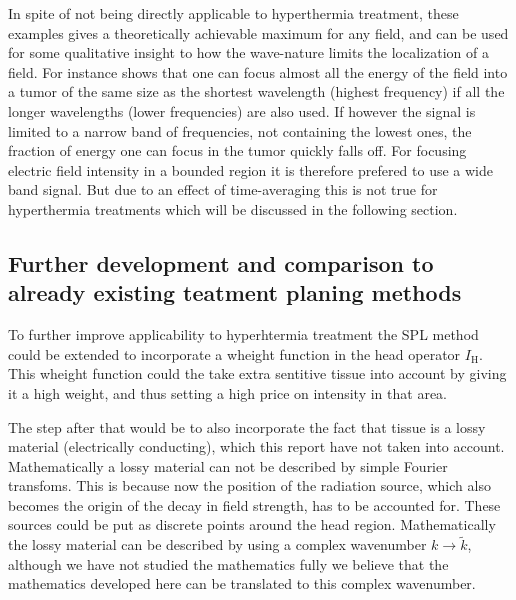 \documentclass[11pt,a4paper, 
swedish,english %
]{article}
\begin{document}
In spite of not being directly applicable to hyperthermia treatment, these examples gives a theoretically achievable maximum for any field, and can be used for some qualitative insight to how the wave-nature limits the localization of a field. For instance  shows that one can focus almost all the energy of the field into a tumor of the same size as the shortest wavelength (highest frequency) if all the longer wavelengths (lower frequencies) are also used. If however the signal is limited to a narrow band of frequencies, not containing the lowest ones, the fraction of energy one can focus in the tumor quickly falls off. For focusing electric field intensity in a bounded region it is therefore prefered to use a wide band signal. But due to an effect of time-averaging this is not true for hyperthermia treatments which will be discussed in the following section.

\subsection{Further development and comparison to already 
existing teatment planing methods}
To further improve applicability to hyperhtermia treatment the SPL
method could be extended to incorporate a wheight function in the
head operator $I_\text{H}$. This wheight function could the take
extra sentitive tissue into account by giving it a high weight, and
thus setting a high price on intensity in that area. 

The step after that would be to also incorporate the fact that tissue
is a lossy material (electrically conducting), which this report have
not taken into account. Mathematically a lossy material can not be
described by simple Fourier transfoms. This is because now the
position of the radiation source, which also becomes the origin of the
decay in field strength, has to be accounted for. These sources could
be put as discrete points around the head region. Mathematically the 
lossy material can be described by using a complex wavenumber 
$k\to\tilde{k}$, although we have not studied the mathematics 
fully we believe that the mathematics developed here can be 
translated to this complex wavenumber\footnotemark{}.

\end{document}
